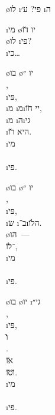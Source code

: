 \textheader%
{ \o{לו}  \i{פי}?}
{ע׳ \i{ה}}
{}
{}
{}
{}
{}

\begin{twocol}
\begin{stanza}
\i{מי} \o{יו} \u{דו} \\
\o{לו}  \i{פי}?\\
\i{כי}…
\end{stanza}

\begin{stanza}
\o{בו} \o{יו} ״\\
 ,\\
  \i{פּי},\\
 \i{מ}  \i{מ}\i{יי} \u{חו},\\
 \i{מ} \i{ה}\i{גי}\\
 \i{היא} \u{רו}.\\
\i{מי}\\
\\
\i{פי}.
\end{stanza}

\begin{stanza}
\o{בו} \o{יו} ״\\
 ,\\
  \i{פּי},\\
 \i{שׂ} \i{ב}־\i{ה}\u{לו}.\\
 \o{הו}~—  \\
־\u{לו},\\
\i{מי}\\
\\
\i{פי}.
\end{stanza}

\begin{stanza}
\o{בו} \o{יו} \i{גי}״\\
 ,\\
  \i{פּי},\\
 \u{ו} \\
.\\
\u{או}   \\
 \u{ו}\u{סו}.\\
\i{מי}\\
\\
\i{פי}.
\end{stanza}


\end{twocol}
